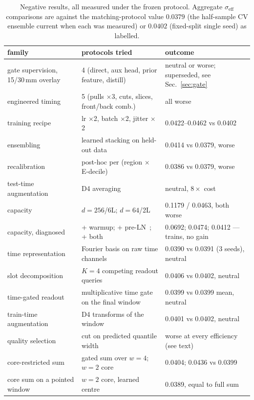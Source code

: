 \documentclass[11pt,a4paper]{article}
\newcommand{\seff}{\ensuremath{\sigma_{\mathrm{eff}}}}
\begin{document}
\begin{table}[h]
\centering
\caption{Negative results, all measured under the frozen protocol.
Aggregate \seff{} comparisons are against the matching-protocol value
$0.0379$ (the half-sample CV ensemble current when each was measured) or
$0.0402$ (fixed-split single seed) as labelled.}
\label{tab:closed}
\footnotesize
\setlength{\tabcolsep}{4pt}
\begin{tabular}{@{}p{}p{}p{}@{}}
\toprule
family & protocols tried & outcome\\
\midrule
gate supervision, 15/30\,mm overlay & 4 (direct, aux head, prior feature, distill) & neutral or worse; superseded, see Sec.~\ref{sec:gate}\\
engineered timing & 5 (pulls $\times$3, cuts, slices, front/back comb.) & all worse\\
training recipe & lr $\times$2, batch $\times$2, jitter $\times$2 & 0.0422--0.0462 vs 0.0402\\
ensembling & learned stacking on held-out data & 0.0414 vs 0.0379, worse\\
recalibration & post-hoc per (region $\times$ E-decile) & 0.0386 vs 0.0379, worse\\
test-time augmentation & D4 averaging & neutral, $8\times$ cost\\
capacity & $d{=}256$/6L; $d{=}64$/2L & 0.1179 / 0.0463, both worse\\
capacity, diagnosed & + warmup; + pre-LN~\cite{preln}; + both & 0.0692; 0.0474; 0.0412 --- trains, no gain\\
time representation & Fourier basis on raw time channels & 0.0390 vs 0.0391 (3 seeds), neutral\\
slot decomposition & $K{=}4$ competing readout queries & 0.0406 vs 0.0402, neutral\\
time-gated readout & multiplicative time gate on the final window & 0.0399 vs 0.0399 mean, neutral\\
train-time augmentation & D4 transforms of the window & 0.0401 vs 0.0402, neutral\\
quality selection & cut on predicted quantile width & worse at every efficiency (see text)\\
core-restricted sum & gated sum over $w{=}4$; $w{=}2$ core & 0.0404; 0.0436 vs 0.0399\\
core sum on a pointed window & $w{=}2$ core, learned centre & 0.0389, equal to full sum\\
\bottomrule
\end{tabular}
\end{table}
\end{document}
